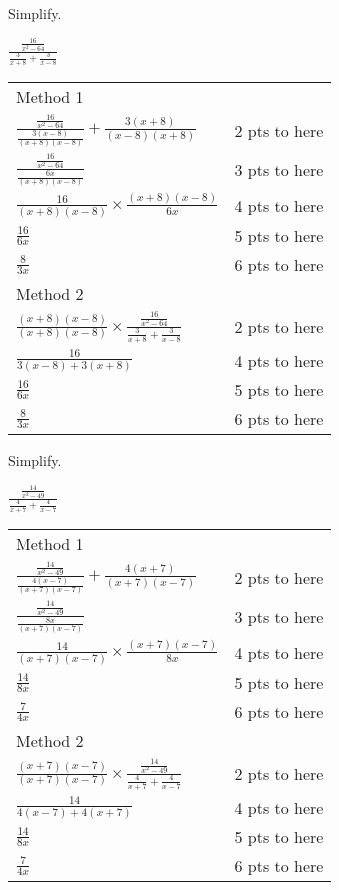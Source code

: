 {
	Simplify.\par
	$\displaystyle \frac{\frac{16}{x^2-64}}{\frac{3}{x+8} +\frac{3}{x-8}}$
}
{
	\begin{tabular}{l r}
	Method 1\\
	$\frac{\frac{16}{x^2-64}}{\frac{3(x-8)}{(x+8)(x-8)}} +\frac{3(x+8)}{(x-8)(x+8)}$ & 2 pts to here\\
	$\frac{\frac{16}{x^2-64}}{\frac{6x}{(x+8)(x-8)}}$ & 3 pts to here\\
	$\frac{16}{(x+8)(x-8)} \times \frac{(x+8)(x-8)}{6x}$ & 4 pts to here\\
	$\frac{16}{6x}$ & 5 pts to here\\
	$\frac{8}{3x}$ & 6 pts to here\\
	Method 2\\
	$ \frac{(x+8)(x-8)}{(x+8)(x-8)} \times \frac{\frac{16}{x^2-64}}{\frac{3}{x+8} +\frac{3}{x-8}}$ & 2 pts to here\\
	$\frac{16}{3(x-8) +3(x+8)}$ & 4 pts to here\\
	$\frac{16}{6x}$ & 5 pts to here\\
	$\frac{8}{3x}$ & 6 pts to here
	\end{tabular}
}

{
	Simplify.\par
	$\displaystyle \frac{\frac{14}{x^2-49}}{\frac{4}{x+7} +\frac{4}{x-7}}$
}
{
	\begin{tabular}{l r}
	Method 1\\
	$\frac{\frac{14}{x^2-49}}{\frac{4(x-7)}{(x+7)(x-7)}} +\frac{4(x+7)}{(x+7)(x-7)}$ & 2 pts to here\\
	$\frac{\frac{14}{x^2-49}}{\frac{8x}{(x+7)(x-7)}}$ & 3 pts to here\\
	$\frac{14}{(x+7)(x-7)} \times \frac{(x+7)(x-7)}{8x}$ & 4 pts to here\\
	$\frac{14}{8x}$ & 5 pts to here\\
	$\frac{7}{4x}$ & 6 pts to here\\
	Method 2\\
	$ \frac{(x+7)(x-7)}{(x+7)(x-7)} \times \frac{\frac{14}{x^2-49}}{\frac{4}{x+7} +\frac{4}{x-7}}$ & 2 pts to here\\
	$\frac{14}{4(x-7) +4(x+7)}$ & 4 pts to here\\
	$\frac{14}{8x}$ & 5 pts to here\\
	$\frac{7}{4x}$ & 6 pts to here
	\end{tabular}
}


